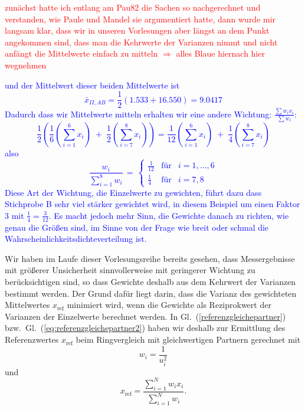 \textcolor{red}{zunächst hatte ich entlang am Pau82 die Sachen so nachgerechnet und verstanden, wie
Paule und Mandel sie argumentiert hatte, dann wurde mir langsam klar, dass wir in unseren Vorlesungen
aber längst an dem Punkt angekommen sind, dass man die Kehrwerte der Varianzen nimmt und nicht
anfängt die Mittelwerte einfach zu mitteln $\Rightarrow$ alles Blaue hiernach hier wegnehmen}

\textcolor{blue}{und der Mittelwert dieser beiden Mittelwerte ist
 \begin{equation}
  \bar x_{II,AB} = \frac{1}{2}\left( 1.533 + 16.550 \right) = 9.0417
 \label{eq:Mittelwerte_x_IIAB}
 \end{equation}
 Dadurch dass wir Mittelwerte mitteln erhalten wir eine andere Wichtung: $\frac{\sum w_i x_i}{\sum w_i}$:
$$
\frac{1}{2} \left( \frac{1}{6} \left(\sum\limits_{i=1}^6 x_i \right) \; + \;
    \frac{1}{2} \left(\sum\limits_{i=7}^8 x_i \right)  \right) =
 \frac{1}{12} \left(\sum\limits_{i=1}^6 x_i \right) \; + \;
    \frac{1}{4} \left(\sum\limits_{i=7}^8 x_i \right)
$$
also 
$$
\frac{w_i}{\sum\limits_{i=1}^8 w_i} \, = \, 
\left\{ \begin{array}{ccl}
\frac{1}{12} & \text{f{\"u}r} & i = 1,\dots,6 \\
\frac{1}{4} & \text{f{\"u}r} & i = 7, 8
\end{array} \right.
$$
Diese Art der Wichtung, die Einzelwerte zu gewichten, führt dazu dass Stichprobe B
sehr viel stärker gewichtet wird, in diesem Beispiel um einen Faktor $3$ mit $\frac{1}{4} = \frac{3}{12}$.
Es macht jedoch mehr Sinn, die Gewichte danach zu richten, wie genau die Größen sind,
im Sinne von der Frage wie breit oder schmal die Wahrscheinlichkeitsdichteverteilung ist.}


Wir haben im Laufe dieser Vorlesungsreihe bereits gesehen, dass
Messergebnisse mit größerer Unsicherheit sinnvollerweise mit geringerer
Wichtung zu berücksichtigen sind, so dass Gewichte
deshalb aus dem Kehrwert der Varianzen bestimmt werden. Der Grund dafür liegt darin,
dass die Varianz des gewichteten Mittelwertes $x_\mathrm{ref}$ minimiert wird,
wenn die Gewichte als Reziprokwert der Varianzen der Einzelwerte berechnet werden.
In Gl.~(\ref{referenzgleichepartner}) bzw.\ Gl.~(\ref{eq:referenzgleichepartner2}) 
haben wir deshalb zur Ermittlung des Referenzwertes $x_\mathrm{ref}$ beim
Ringvergleich mit gleichwertigen Partnern gerechnet mit
\begin{equation*}
    w_i = \frac{1}{u^2_i}
\end{equation*}
und
\begin{equation*}
 x_\mathrm{ref} = \frac{\sum\limits_{i=1}^N w_i x_i}{\sum\limits_{i=1}^N w_i} .
\end{equation*}


